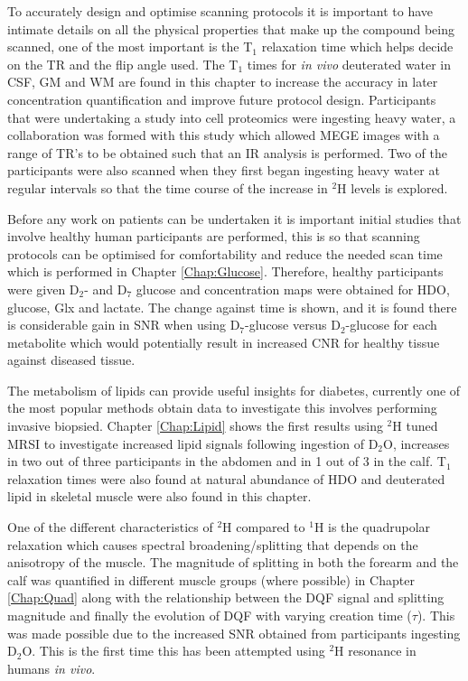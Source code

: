 To accurately design and optimise scanning protocols it is important to have intimate details on all the physical properties that make up the compound being scanned, one of the most important is the T$_1$ relaxation time which helps decide on the \ac{TR} and the flip angle used. The T$_1$ times for \textit{in vivo} deuterated water in \ac{CSF}, \ac{GM} and \ac{WM} are found in this chapter to increase the accuracy in later concentration quantification and improve future protocol design. Participants that were undertaking a study into cell proteomics were ingesting heavy water, a collaboration was formed with this study which allowed \ac{MEGE} images with a range of \ac{TR}'s to be obtained such that an \ac{IR} analysis is performed. Two of the participants were also scanned when they first began ingesting heavy water at regular intervals so that the time course of the increase in $^2$H levels is explored.

Before any work on patients can be undertaken it is important initial studies that involve healthy human participants are performed, this is so that scanning protocols can be optimised for comfortability and reduce the needed scan time which is performed in Chapter \ref{Chap:Glucose}. Therefore, healthy participants were given D$_2$- and D$_7$ glucose and concentration maps were obtained for \ac{HDO}, glucose, Glx and lactate. The change against time is shown, and it is found there is considerable gain in \ac{SNR} when using D$_7$-glucose versus D$_2$-glucose for each metabolite which would potentially result in increased \ac{CNR} for healthy tissue against diseased tissue.

The metabolism of lipids can provide useful insights for diabetes, currently one of the most popular methods obtain data to investigate this involves performing invasive biopsied. Chapter \ref{Chap:Lipid} shows the first results using $^2$H tuned MRSI to investigate increased lipid signals following ingestion of D$_2$O, increases in two out of three participants in the abdomen and in 1 out of 3 in the calf. T$_1$ relaxation times were also found at natural abundance of \ac{HDO} and deuterated lipid in skeletal muscle were also found in this chapter.

One of the different characteristics of $^2$H compared to $^1$H is the quadrupolar relaxation which causes spectral broadening/splitting that depends on the anisotropy of the muscle. The magnitude of splitting in both the forearm and the calf was quantified in different muscle groups (where possible) in Chapter \ref{Chap:Quad} along with the relationship between the \ac{DQF} signal and splitting magnitude and finally the evolution of \ac{DQF} with varying creation time ($\tau$). This was made possible due to the increased \ac{SNR} obtained from participants ingesting D$_2$O. This is the first time this has been attempted using $^2$H resonance in humans \textit{in vivo}. 

